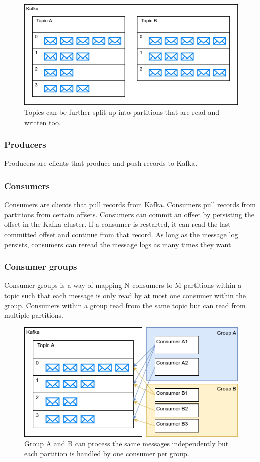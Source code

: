 \documentclass[11pt]{article}
\begin{document}
\begin{figure}[htbp]
\centerline{\includegraphics[scale=0.7]{assets/partitions.png}}
\caption{Topics can be further split up into partitions that are read and written too.}
\label{fig}
\end{figure}

\subsubsection{Producers}
Producers are clients that produce and push records to Kafka.

\subsubsection{Consumers}
Consumers are clients that pull records from Kafka. Consumers pull records from partitions from certain offsets. Consumers can commit an offset by persisting the offset in the Kafka cluster. If a consumer is restarted, it can read the last committed offset and continue from that record. As long as the message log persists, consumers can reread the message logs as many times they want.

\subsubsection{Consumer groups}
Consumer groups is a way of mapping N consumers to M partitions within a topic such that each message is only read by at most one consumer within the group. Consumers within a group read from the same topic but can read from multiple partitions.

\begin{figure}[htbp]
\centerline{\includegraphics[scale=0.7]{assets/cgroup.png}}
\caption{Group A and B can process the same messages independently but each partition is handled by one consumer per group.}
\label{fig}
\end{figure}
\end{document}
